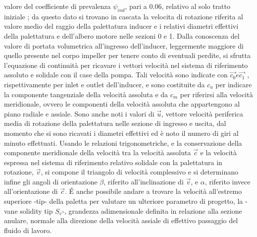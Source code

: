 valore del coefficiente di prevalenza $\psi_{ind}$, pari a $0.06$, relativo al solo tratto iniziale \cite{AIAA_book_1}; da questo dato si trovano in cascata la velocita di rotazione riferita al valore medio del raggio della palettatura inducer e i relativi diametri effettivi della palettatura e dell'albero motore nelle sezioni 0 e 1. Dalla conoscenza del valore di portata volumetrica all'ingresso dell'inducer, leggermente maggiore di quello presente nel corpo impeller per tenere conto di eventuali perdite, si sfrutta l'equazione di continuità per ricavare i vettori velocità nel sistema di riferimento assoluto e solidale con il case della pompa. Tali velocità sono indicate con $\overrightarrow{c_0} e \overrightarrow{c_1}$ , rispettivamente per inlet e outlet dell'inducer, e sono costituite da $c_u$ per indicare la componente tangenziale della velocità assoluta e da $c_m$ per riferirsi alla velocità meridionale, ovvero le componenti della velocità assoluta che appartengono al piano radiale e assiale. Sono anche noti i valori di $\overrightarrow{u}$, vettore velocità periferica media di rotazione della palettatura nelle sezione di ingresso e uscita, dal momento che si sono ricavati i diametri effettivi ed è noto il numero di giri al minuto effettuati. Usando le relazioni trigonometriche, e la conservazione della componente meridionale della velocità tra la velocità assoluta $\overrightarrow{c}$ e la velocità espressa nel sistema di riferimento relativo solidale con la palettatura in rotazione, $\overrightarrow{v}$, si compone il triangolo di velocità complessivo e si determinano infine gli angoli di orientazione $\beta$, riferito all'inclinazione di  $\overrightarrow{v}$, e $\alpha$, riferito invece all'orientazione di $\overrightarrow{c}$.
\'E anche possibile andare a trovare la velocità all'estremo superiore -tip- della paletta per valutare un ulteriore parametro di progetto, la -vane solidity tip $S_v$-, grandezza adimensionale definita in relazione alla sezione anulare, normale alla direzione della velocità assiale di effettivo passaggio del fluido di lavoro.\\

